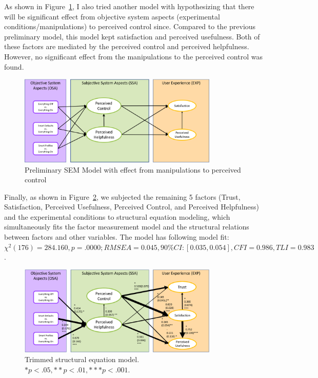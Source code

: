 As shown in Figure~\ref{fig:semmodel2}, I also tried another model with hypothesizing that there will be significant effect from objective system aspects (experimental conditions/manipulations) to perceived control since. Compared to the previous preliminary model, this model kept satisfaction and perceived usefulness. Both of these factors are mediated by the perceived control and perceived helpfulness. However, no significant effect from the manipulations to the perceived control was found.
\begin{figure}
	\centering
	\includegraphics[width=0.85\textwidth]{figures/semmodel2.png}
	\caption{Preliminary SEM Model with effect from manipulations to perceived control}
	\label{fig:semmodel2}
\end{figure}

Finally, as shown in Figure~\ref{fig:finalcoremodel}, we subjected the remaining 5 factors (Trust, Satisfaction, Perceived Usefulness, Perceived Control, and Perceived Helpfulness) and the experimental conditions to structural equation modeling, which simultaneously fits the factor measurement model and the structural relations between factors and other variables. The model has following model fit: ${\chi}^{2}(176) = 284.160, p = .0000; RMSEA = 0.045, 90\% CI: [0.035, 0.054], CFI = 0.986, TLI = 0.983$.

\begin{figure}
	\centering
	\includegraphics[width=0.85\textwidth]{figures/sem_model.pdf}
	\caption{ Trimmed structural equation model. $* p < .05, ** p < .01, *** p < .001$.}
	\label{fig:finalcoremodel}
\end{figure}

